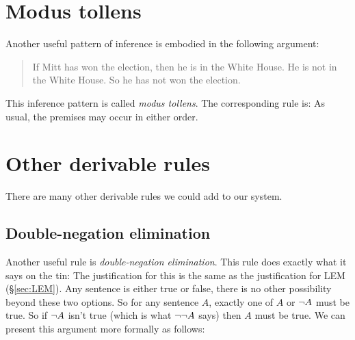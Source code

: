 \section{Modus tollens}
Another useful pattern of inference is embodied in the following argument:
	\begin{quote}
		If Mitt has won the election, then he is in the White House. He is not in the White House. So he has not won the election.
	\end{quote}
This inference pattern is called \emph{modus tollens}. The corresponding rule is:
As usual, the premises may occur in either order.

\section{Other derivable rules}
There are many other derivable rules we could add to our system. 

\subsection{Double-negation elimination}
Another useful rule is \emph{double-negation elimination}. This rule does exactly what it says on the tin:
The justification for this is the same as the justification for LEM (\S\ref{sec:LEM}).
Any sentence is either true or false, there is no other possibility beyond these two options.  So for any sentence $A$, exactly one of $A$ or $\neg A$ must be true.
So if $\neg A$ isn't true (which is what $\neg \neg A$ says) then $A$ must be true.  We can present this argument more formally as follows:

